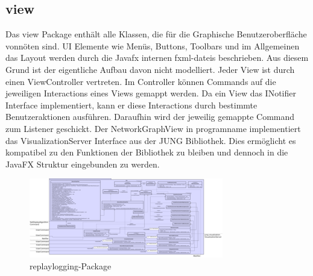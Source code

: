 \subsection{view}
\label{subsec:view}

Das view Package enthält alle Klassen, die für die Graphische Benutzeroberfläche vonnöten sind. UI Elemente wie Menüs, Buttons, Toolbars und im Allgemeinen das Layout werden durch die Javafx internen \glspl{fxml-datei} beschrieben. Aus diesem Grund ist der eigentliche Aufbau davon nicht modelliert.
Jeder View ist durch einen ViewController vertreten. Im Controller können Commands auf die jeweiligen Interactions eines Views gemappt werden. Da ein View das INotifier Interface implementiert, kann er diese Interactions durch bestimmte Benutzeraktionen ausführen. Daraufhin wird der jeweilig gemappte Command zum Listener geschickt.
Der NetworkGraphView in \gls{programname} implementiert das VisualizationServer Interface aus der JUNG Bibliothek. Dies ermöglicht es kompatibel zu den Funktionen der Bibliothek zu bleiben und dennoch in die JavaFX Struktur eingebunden zu werden.

\clearpage
\begin{figure}
  \centering
  \includegraphics[width=\textwidth]{../diagramimages/view.png}
  \caption{replaylogging-Package}
\end{figure}
\clearpage
